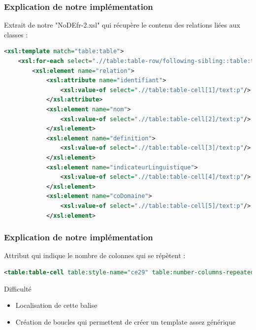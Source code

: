 \documentclass{beamer}
\begin{document}
\begin{frame}[fragile]
\frametitle{Explication de notre implémentation}

Extrait de notre "NoDEfr-2.xsl" qui récupère le contenu des relations liées aux classes :

\vspace{0.5cm}
\begin{lstlisting}[language=XML]
<xsl:template match="table:table">
    <xsl:for-each select=".//table:table-row/following-sibling::table:table-row[1]">
        <xsl:element name="relation">
            <xsl:attribute name="identifiant">
                <xsl:value-of select=".//table:table-cell[1]/text:p"/>
            </xsl:attribute>
            <xsl:element name="nom">
                <xsl:value-of select=".//table:table-cell[2]/text:p"/>
            </xsl:element>
            <xsl:element name="definition">
                <xsl:value-of select=".//table:table-cell[3]/text:p"/>
            </xsl:element>
            <xsl:element name="indicateurLinguistique">
                <xsl:value-of select=".//table:table-cell[4]/text:p"/>
            </xsl:element>
            <xsl:element name="coDomaine">
                <xsl:value-of select=".//table:table-cell[5]/text:p"/>
            </xsl:element>
\end{lstlisting}
\end{frame}


\begin{frame}[fragile]
\frametitle{Explication de notre implémentation}

Attribut qui indique le nombre de colonnes qui se répètent :

\vspace{0.5cm}
\begin{lstlisting}[language=XML]
<table:table-cell table:style-name="ce29" table:number-columns-repeated="3"/>
\end{lstlisting}

\begin{alertblock}{Difficulté}
\begin{itemize}
    \item Localisation de cette balise
    \item Création de boucles qui permettent de créer un template assez générique
\end{itemize}
\end{alertblock}


\end{frame}
\end{document}
